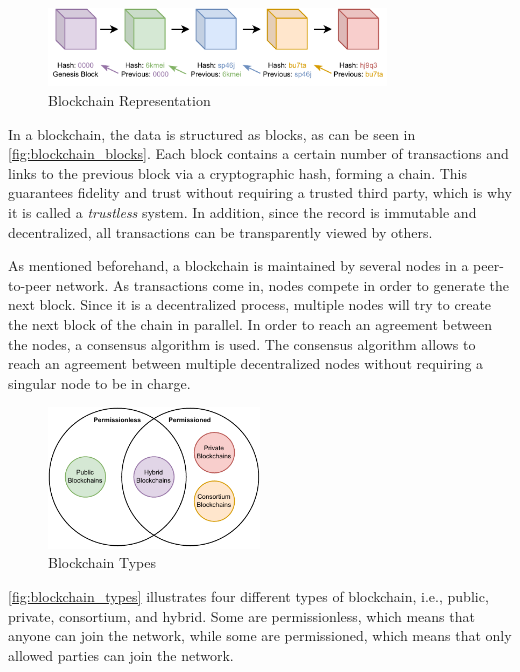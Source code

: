 \begin{figure}[h]
    \centering
    \includegraphics[width=0.8\textwidth]{graphics/blockchain.pdf}
    \caption{Blockchain Representation}
    \label{fig:blockchain_blocks}
\end{figure}

In a blockchain, the data is structured as blocks, as can be seen in \autoref{fig:blockchain_blocks}. Each block contains a certain number of transactions and links to the previous block via a cryptographic hash, forming a chain. This guarantees fidelity and trust without requiring a trusted third party, which is why it is called a \textit{trustless} system. In addition, since the record is immutable and decentralized, all transactions can be transparently viewed by others.

As mentioned beforehand, a blockchain is maintained by several nodes in a peer-to-peer network. As transactions come in, nodes compete in order to generate the next block. Since it is a decentralized process, multiple nodes will try to create the next block of the chain in parallel. In order to reach an agreement between the nodes, a consensus algorithm is used. The consensus algorithm allows to reach an agreement between multiple decentralized nodes without requiring a singular node to be in charge.

\begin{figure}[h]
    \centering
    \includegraphics[width=0.5\textwidth]{graphics/blockchain-types.pdf}
    \caption{Blockchain Types}
    \label{fig:blockchain_types}
\end{figure}

\autoref{fig:blockchain_types} illustrates four different types of blockchain, i.e., public, private, consortium, and hybrid. Some are permissionless, which means that anyone can join the network, while some are permissioned, which means that only allowed parties can join the network. 

